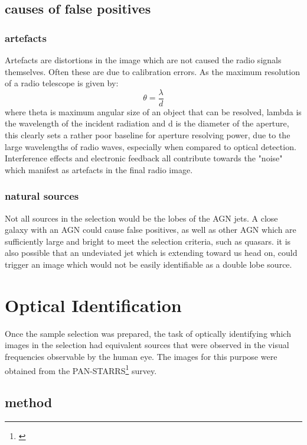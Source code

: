 \documentclass{article}
\begin{document}
\subsection{causes of false positives}

\subsubsection{artefacts}
Artefacts are distortions in the image which are not caused the radio signals themselves. Often these are due to calibration errors. As the maximum resolution of a radio telescope is given by:
\begin{equation}
    \theta = \frac{\lambda}{d}
\end{equation}
where theta is maximum angular size of an object that can be resolved, lambda is the wavelength of the incident radiation and d is the diameter of the aperture, this clearly sets a rather poor baseline for aperture resolving power, due to the large wavelengths of radio waves, especially when compared to optical detection. Interference effects and electronic feedback all contribute towards the "noise" which manifest as artefacts in the final radio image.

\subsubsection{natural sources}
Not all sources in the selection would be the lobes of the AGN jets. A close galaxy with an AGN could cause false positives, as well as other AGN which are sufficiently large and bright to meet the selection criteria, such as quasars. it is also possible that an undeviated jet which is extending toward us head on, could trigger an image which would not be easily identifiable as a double lobe source.

\section{Optical Identification}
Once the sample selection was prepared, the task of optically identifying which images in the selection had equivalent sources that were observed in the visual frequencies observable by the human eye. The images for this purpose were obtained from the PAN-STARRS\footnote{\cite{panstarrs}} survey.

\subsection{method}
\end{document}

